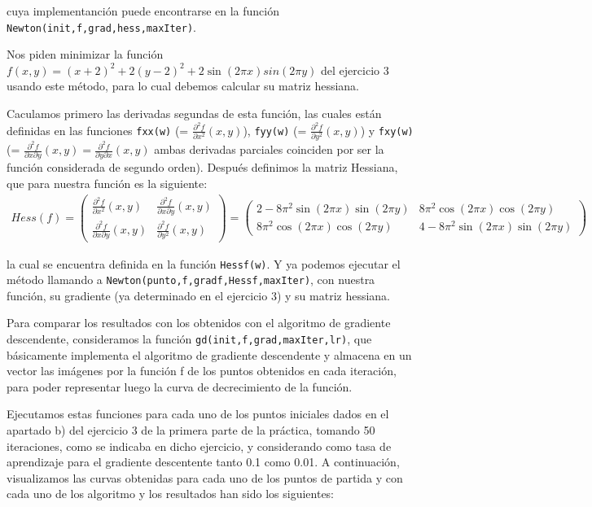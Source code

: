 \documentclass[a4]{article}
\begin{document}
cuya implementanción puede encontrarse en la función \lstinline|Newton(init,f,grad,hess,maxIter)|. 

Nos piden minimizar la función $f(x,y)=(x+2)^2 +2(y-2)^2 +2\sin(2\pi x)sin(2\pi y)$ del ejercicio 3 usando este método, para lo cual debemos calcular su matriz hessiana. 

Caculamos primero las derivadas segundas de esta función, las cuales están definidas en las funciones \lstinline|fxx(w)| (= $\frac{\partial^2 f }{\partial x^2}(x,y)$), \lstinline|fyy(w)| (= $\frac{\partial^2 f }{\partial y^2}(x,y)$) y \lstinline|fxy(w)| (= $\frac{\partial^2 f }{\partial x \partial y}(x,y) = \frac{\partial^2 f }{\partial y \partial x}(x,y)$ ambas derivadas parciales coinciden por ser la función considerada de segundo orden).  Después definimos la matriz Hessiana, que para nuestra función es la siguiente:
\begin{align*}
Hess(f)= \begin{pmatrix}
\frac{\partial^2 f }{\partial x^2}(x,y) & \frac{\partial^2 f }{\partial x \partial y}(x,y) \\
\frac{\partial^2 f }{\partial x \partial y}(x,y) & \frac{\partial^2 f }{\partial y^2}(x,y)
\end{pmatrix}= 
\begin{pmatrix}
2-8\pi^2 \sin(2\pi x) \sin(2\pi y) & 8\pi^2 \cos(2\pi x) \cos(2\pi y) \\
8\pi^2 \cos(2\pi x) \cos(2\pi y) & 4-8\pi^2 \sin(2\pi x) \sin(2\pi y)
\end{pmatrix}
\end{align*}

la cual se encuentra definida en la función \lstinline|Hessf(w)|. Y ya podemos ejecutar el método llamando a \lstinline|Newton(punto,f,gradf,Hessf,maxIter)|, con nuestra función, su gradiente (ya determinado en el ejercicio 3) y su matriz hessiana. 

Para comparar los resultados con los obtenidos con el algoritmo de gradiente descendente, consideramos la función \lstinline|gd(init,f,grad,maxIter,lr)|, que básicamente implementa el algoritmo de gradiente descendente y almacena en un vector las imágenes por la función f de los puntos obtenidos en cada iteración, para poder representar luego la curva de decrecimiento de la función. 

Ejecutamos estas funciones para cada uno de los puntos iniciales dados en el apartado b) del ejercicio 3 de la primera parte de la práctica, tomando 50 iteraciones, como se indicaba en dicho ejercicio, y considerando como tasa de aprendizaje para el gradiente descentente tanto 0.1 como 0.01. A continuación, visualizamos las curvas obtenidas para cada uno de los puntos de partida y con cada uno de los algoritmo y los resultados han sido los siguientes:
\end{document}

